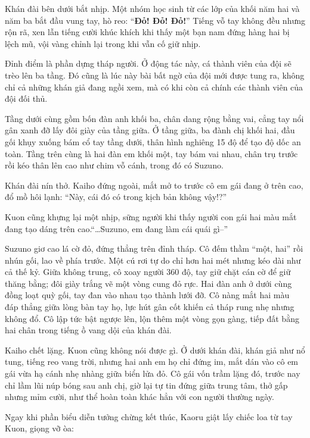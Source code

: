 \documentclass[../main.tex]{subfiles}
\begin{document}
Khán đài bên dưới bắt nhịp. Một nhóm học sinh từ các lớp của khối năm hai và năm ba bắt đầu vung tay, hò reo: ``\textbf{Đỏ! Đỏ! Đỏ!}'' Tiếng vỗ tay không đều nhưng rộn rã, xen lẫn tiếng cười khúc khích khi thấy một bạn nam đứng hàng hai bị lệch mũ, vội vàng chỉnh lại trong khi vẫn cố giữ nhịp.

Đỉnh điểm là phần dựng tháp người. Ở động tác này, cá thành viên của đội sẽ trèo lên ba tầng. Đó cũng là lúc này bài bất ngờ của đội mới được tung ra, không chỉ cả những khán giả đang ngồi xem, mà có khi còn cả chính các thành viên của đội đối thủ.

Tầng dưới cùng gồm bốn đàn anh khối ba, chân dang rộng bằng vai, cẳng tay nổi gân xanh đỡ lấy đôi giày của tầng giữa. Ở tầng giữa, ba đành chị khối hai, đầu gối khụy xuống bám cổ tay tầng dưới, thân hình nghiêng 15 độ để tạo độ dốc an toàn.  Tầng trên cùng là hai đàn em khối một, tay bám vai nhau, chân trụ trước rồi kéo thân lên cao như chim vỗ cánh, trong đó có Suzuno.

Khán đài nín thở. Kaiho đứng ngoài, mắt mở to trước cô em gái đang ở trên cao, đổ mồ hôi lạnh: ``Này, cái đó có trong kịch bản không vậy!?''

Kuon cũng khựng lại một nhịp, sững người khi thấy người con gái hai màu mắt đang tạo dáng trên cao.``\dots Suzuno, em đang làm cái quái gì--''

Suzuno giơ cao lá cờ đỏ, đứng thẳng trên đỉnh tháp. Cô đếm thầm ``một, hai'' rồi nhún gối, lao về phía trước. Một cú rơi tự do chỉ hơn hai mét nhưng kéo dài như cả thế kỷ. Giữa không trung, cô xoay người 360 độ, tay giữ chặt cán cờ để giữ thăng bằng; đôi giày trắng vẽ một vòng cung đỏ rực. Hai đàn anh ở dưới cùng đồng loạt quỳ gối, tay đan vào nhau tạo thành lưới đỡ. Cô nàng mắt hai màu đáp thẳng giữa lòng bàn tay họ, lực hút gân cốt khiến cả tháp rung nhẹ nhưng không đổ. Cô lập tức bật ngược lên, lộn thêm một vòng gọn gàng, tiếp đất bằng hai chân trong tiếng ồ vang dội của khán đài.

Kaiho chết lặng. Kuon cũng không nói được gì. Ở dưới khán đài, khán giả như nổ tung, tiếng reo vang trời, nhưng hai anh em họ chỉ đứng im, mắt dán vào cô em gái vừa hạ cánh nhẹ nhàng giữa biển lửa đỏ. Cô gái vốn trầm lặng đó, trước nay chỉ lầm lũi núp bóng sau anh chị, giờ lại tự tin đứng giữa trung tâm, thở gấp nhưng mỉm cười, như thể hoàn toàn khác hẳn với con người thường ngày.

Ngay khi phần biểu diễn tưởng chừng kết thúc, Kaoru giật lấy chiếc loa từ tay Kuon, giọng vỡ òa:
\end{document}
